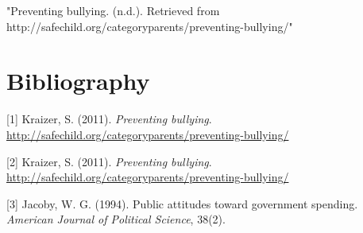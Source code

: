 \documentclass[12pt]{article}
\begin{document}
"Preventing bullying. (n.d.). Retrieved from http://safechild.org/categoryparents/preventing-bullying/"

\section*{Bibliography}
[1] Kraizer, S. (2011). \emph{Preventing bullying}. \url{http://safechild.org/categoryparents/preventing-bullying/}

[2] Kraizer, S. (2011). \emph{Preventing bullying}. \url{http://safechild.org/categoryparents/preventing-bullying/}

[3] Jacoby, W. G. (1994). Public attitudes toward government spending. \emph{American Journal of Political Science}, 38(2). 
\end{document}
